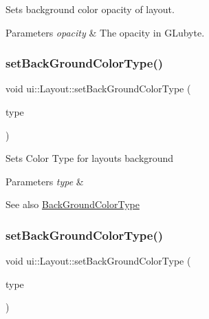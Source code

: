 Sets background color opacity of layout.


\begin{DoxyParams}{Parameters}
{\em opacity} & The opacity in {\ttfamily G\+Lubyte}. \\
\hline
\end{DoxyParams}
\mbox{\label{classui_1_1Layout_a7a6bd8944919e7030cfa62ee6b870a86}} 
\subsubsection{\texorpdfstring{set\+Back\+Ground\+Color\+Type()}{setBackGroundColorType()}\hspace{0.1cm}{\footnotesize\ttfamily [1/2]}}
{\footnotesize\ttfamily void ui\+::\+Layout\+::set\+Back\+Ground\+Color\+Type (\begin{DoxyParamCaption}\item[{\hyperlink{classui_1_1Layout_a2aad69f15823c5f22d8ed72bf2ac7472}{Back\+Ground\+Color\+Type}}]{type }\end{DoxyParamCaption})}

Sets Color Type for layout\textquotesingle{}s background


\begin{DoxyParams}{Parameters}
{\em type} & \\
\hline
\end{DoxyParams}
\begin{DoxySeeAlso}{See also}
{\ttfamily \hyperlink{classui_1_1Layout_a2aad69f15823c5f22d8ed72bf2ac7472}{Back\+Ground\+Color\+Type}} 
\end{DoxySeeAlso}
\mbox{\label{classui_1_1Layout_a7a6bd8944919e7030cfa62ee6b870a86}} 
\subsubsection{\texorpdfstring{set\+Back\+Ground\+Color\+Type()}{setBackGroundColorType()}\hspace{0.1cm}{\footnotesize\ttfamily [2/2]}}
{\footnotesize\ttfamily void ui\+::\+Layout\+::set\+Back\+Ground\+Color\+Type (\begin{DoxyParamCaption}\item[{\hyperlink{classui_1_1Layout_a2aad69f15823c5f22d8ed72bf2ac7472}{Back\+Ground\+Color\+Type}}]{type }\end{DoxyParamCaption})}

